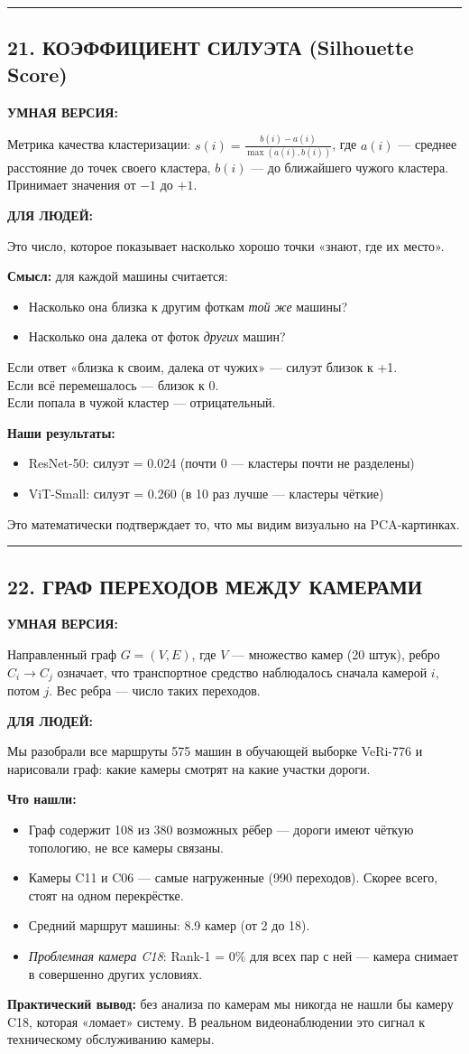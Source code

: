 \documentclass[12pt,a4paper]{article}
\newcommand{\term}[3]{
\noindent\rule{\textwidth}{1pt}
\subsection*{#1}

\textcolor{smartgreen}{\textbf{УМНАЯ ВЕРСИЯ:}}

#2

\vspace{0.5em}
\textcolor{simpleblue}{\textbf{ДЛЯ ЛЮДЕЙ:}}

#3

\vspace{1em}
}
\begin{document}
\term{21. КОЭФФИЦИЕНТ СИЛУЭТА (Silhouette Score)}
{Метрика качества кластеризации: $s(i) = \frac{b(i) - a(i)}{\max(a(i), b(i))}$, где $a(i)$ — среднее расстояние до точек своего кластера, $b(i)$ — до ближайшего чужого кластера. Принимает значения от $-1$ до $+1$.}
{Это число, которое показывает насколько хорошо точки «знают, где их место».

\textbf{Смысл:} для каждой машины считается:
\begin{itemize}
    \item Насколько она близка к другим фоткам \emph{той же} машины?
    \item Насколько она далека от фоток \emph{других} машин?
\end{itemize}

Если ответ «близка к своим, далека от чужих» — силуэт близок к +1.\\
Если всё перемешалось — близок к 0.\\
Если попала в чужой кластер — отрицательный.

\textbf{Наши результаты:}
\begin{itemize}
    \item ResNet-50: силуэт = 0.024 (почти 0 — кластеры почти не разделены)
    \item ViT-Small: силуэт = 0.260 (в 10 раз лучше — кластеры чёткие)
\end{itemize}

Это математически подтверждает то, что мы видим визуально на PCA-картинках.}

\term{22. ГРАФ ПЕРЕХОДОВ МЕЖДУ КАМЕРАМИ}
{Направленный граф $G = (V, E)$, где $V$ — множество камер (20 штук), ребро $C_i \to C_j$ означает, что транспортное средство наблюдалось сначала камерой $i$, потом $j$. Вес ребра — число таких переходов.}
{Мы разобрали все маршруты 575 машин в обучающей выборке VeRi-776 и нарисовали граф: какие камеры смотрят на какие участки дороги.

\textbf{Что нашли:}
\begin{itemize}
    \item Граф содержит 108 из 380 возможных рёбер — дороги имеют чёткую топологию, не все камеры связаны.
    \item Камеры C11 и C06 — самые нагруженные (990 переходов). Скорее всего, стоят на одном перекрёстке.
    \item Средний маршрут машины: 8.9 камер (от 2 до 18).
    \item \emph{Проблемная камера C18}: Rank-1 = 0\% для всех пар с ней — камера снимает в совершенно других условиях.
\end{itemize}

\textbf{Практический вывод:} без анализа по камерам мы никогда не нашли бы камеру C18, которая «ломает» систему. В реальном видеонаблюдении это сигнал к техническому обслуживанию камеры.}
\end{document}
